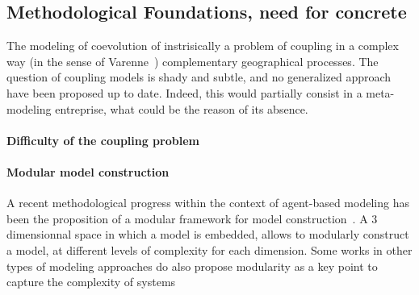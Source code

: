 






\subsection{Methodological Foundations, need for concrete}


The modeling of coevolution of instrisically a problem of coupling in a complex way (in the sense of Varenne~\cite{varenne2010framework})
complementary geographical processes. The question of coupling models is shady and subtle, and no generalized approach have been proposed up to date. Indeed, this would partially consist in a meta-modeling entreprise, what could be the reason of its absence.

\paragraph{Difficulty of the coupling problem}


\paragraph{Modular model construction}

A recent methodological progress within the context of agent-based modeling has been the proposition of a modular framework for model construction~\cite{cottineau2015incremental}. A 3 dimensionnal space in which a model is embedded, allows to modularly construct a model, at different levels of complexity for each dimension. Some works in other types of modeling approaches do also propose modularity as a key point to capture the complexity of systems


